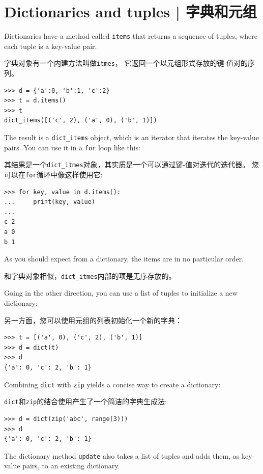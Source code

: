 \section{Dictionaries and tuples | 字典和元组}
\label{dictuple}
 
 

Dictionaries have a method called {\tt items} that returns a sequence of
tuples, where each tuple is a key-value pair.

字典对象有一个内建方法叫做\lstinline{itmes}， 它返回一个以元组形式存放的键-值对的序列。

\begin{lstlisting}
>>> d = {'a':0, 'b':1, 'c':2}
>>> t = d.items()
>>> t
dict_items([('c', 2), ('a', 0), ('b', 1)])
\end{lstlisting}
%
The result is a \verb"dict_items" object, which is an iterator that
iterates the key-value pairs.  You can use it in a {\tt for} loop
like this:

其结果是一个\lstinline{dict_itmes}对象，其实质是一个可以通过键-值对迭代的迭代器。 您可以在\lstinline{for}循环中像这样使用它:

\begin{lstlisting}
>>> for key, value in d.items():
...     print(key, value)
...
c 2
a 0
b 1
\end{lstlisting}
%
As you should expect from a dictionary, the items are in no
particular order.

和字典对象相似，\lstinline{dict_itmes}内部的项是无序存放的。

Going in the other direction, you can use a list of tuples to
initialize a new dictionary:

另一方面，您可以使用元组的列表初始化一个新的字典：

\begin{lstlisting}
>>> t = [('a', 0), ('c', 2), ('b', 1)]
>>> d = dict(t)
>>> d
{'a': 0, 'c': 2, 'b': 1}
\end{lstlisting}

Combining {\tt dict} with {\tt zip} yields a concise way
to create a dictionary:

\lstinline{dict}和\lstinline{zip}的结合使用产生了一个简洁的字典生成法:

\begin{lstlisting}
>>> d = dict(zip('abc', range(3)))
>>> d
{'a': 0, 'c': 2, 'b': 1}
\end{lstlisting}
%
The dictionary method {\tt update} also takes a list of tuples
and adds them, as key-value pairs, to an existing dictionary.



